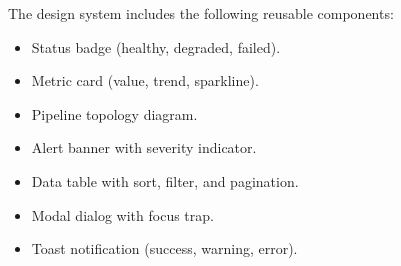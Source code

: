 \documentclass[
    language=english,
    doctype=technical-report,
    institution=none,
    titlestyle=book,
    oneside,
]{../../omnilatex}
\begin{document}
The design system includes the following reusable components:

\begin{itemize}
    \item Status badge (healthy, degraded, failed).
    \item Metric card (value, trend, sparkline).
    \item Pipeline topology diagram.
    \item Alert banner with severity indicator.
    \item Data table with sort, filter, and pagination.
    \item Modal dialog with focus trap.
    \item Toast notification (success, warning, error).
\end{itemize}

\printbibliography[heading=bibintoc, title={References}]
\end{document}
